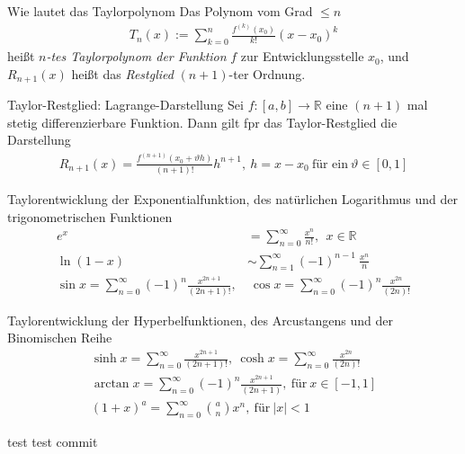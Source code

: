 \begin{karte}{Wie lautet das Taylorpolynom}
	Das Polynom vom Grad \(\leq n \)
	\begin{align}
		T_{n}(x):=\sum_{k=0}^n\frac{f^{(k)}(x_{0})}{k!}{(x-x_{0})}^{k}
	\end{align}
	heißt \emph{\(n\)-tes Taylorpolynom der Funktion} \(f\) zur Entwicklungsstelle \(x_0\), und \(R_{n+1}(x)\) heißt das \emph{Restglied} \((n+1)\)-ter Ordnung.
\end{karte}

\begin{karte}{Taylor-Restglied: Lagrange-Darstellung}
	Sei \(f:[a,b]\to\mathbb{R}\) eine \((n+1)\) mal stetig differenzierbare Funktion. Dann gilt fpr das Taylor-Restglied die Darstellung
{\large
	\begin{align}
		R_{n+1}(x)=\frac{f^{(n+1)}(x_{0}+\vartheta h)}{(n+1)!} h^{n+1},\ h=x-x_0\  \text{für ein}\ \vartheta\in[0,1]
	\end{align}
	}
\end{karte}

\begin{karte}{Taylorentwicklung der Exponentialfunktion, des natürlichen Logarithmus und der trigonometrischen Funktionen}
	\begin{align}
		e^{x}&=\sum_{n=0}^{\infty}\frac{x^{n}}{n!},\ \ x\in\mathbb{R}\\
		\ln{(1-x)}&\sim\sum_{n=1}^{\infty}{(-1)}^{n-1}\:\frac{x^{n}}{n}\\
		\sin{x}=\sum_{n=0}^{\infty}{(-1)}^{n}\frac{x^{2n+1}}{(2n+1)!},&\ \cos{x}=\sum_{n=0}^{\infty}{(-1)}^{n}\frac{x^{2n}}{(2n)!}
	\end{align}

\end{karte}

\begin{karte}{Taylorentwicklung der Hyperbelfunktionen, des Arcustangens und der Binomischen Reihe}
	\begin{align}
		\sinh{x}=\sum_{n=0}^{\infty}\frac{x^{2n+1}}{(2n+1)!},\ \cosh{x}=\sum_{n=0}^{\infty}\frac{x^{2n}}{(2n)!}\\
		\arctan{x}=\sum_{n=0}^{\infty}{(-1)}^{n}\frac{x^{2n+1}}{(2n+1)},\ \text{für}\ x\in [-1,1]\\
		{(1+x)}^{a}=\sum_{n=0}^{\infty}\binom{a}{n}x^{n},\ \text{für}\ \lvert x\rvert <1
	\end{align}
\end{karte}

\begin{kartei}{test}
	test commit
\end{kartei}
